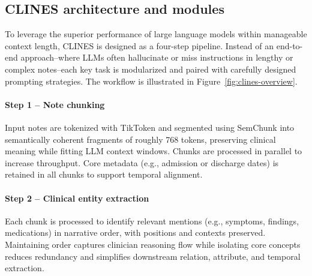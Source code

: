 \subsection{CLINES architecture and modules}

To leverage the superior performance of large language models within manageable context length, CLINES is designed as a four-step pipeline. Instead of an end-to-end approach--where LLMs often hallucinate or miss instructions in lengthy or complex notes--each key task is modularized and paired with carefully designed prompting strategies. The workflow is illustrated in Figure~\ref{fig:clines-overview}.



\paragraph{Step 1 -- Note chunking} Input notes are tokenized with TikToken \cite{tiktoken2024} and segmented using SemChunk \cite{semchunk2024} into semantically coherent fragments of roughly 768 tokens, preserving clinical meaning while fitting LLM context windows. Chunks are processed in parallel to increase throughput. Core metadata (e.g., admission or discharge dates) is retained in all chunks to support temporal alignment. 

\paragraph{Step 2 -- Clinical entity extraction} Each chunk is processed to identify relevant mentions (e.g., symptoms, findings, medications) in narrative order, with positions and contexts preserved. Maintaining order captures clinician reasoning flow while isolating core concepts reduces redundancy and simplifies downstream relation, attribute, and temporal extraction.

